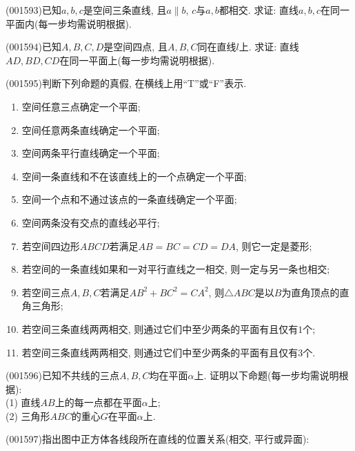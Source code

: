 \item (001593)已知$a,b,c$是空间三条直线, 且$a\parallel b$, $c$与$a,b$都相交. 求证: 直线$a,b,c$在同一平面内(每一步均需说明根据).
\item (001594)已知$A,B,C,D$是空间四点, 且$A,B,C$同在直线$l$上. 求证: 直线$AD,BD,CD$在同一平面上(每一步均需说明根据).
\item (001595)判断下列命题的真假, 在横线上用``T''或``F''表示.
\begin{enumerate}[\blank{30}(1)]
\item 空间任意三点确定一个平面;\\ 
\item 空间任意两条直线确定一个平面;\\ 
\item 空间两条平行直线确定一个平面;\\ 
\item 空间一条直线和不在该直线上的一个点确定一个平面;\\ 
\item 空间一个点和不通过该点的一条直线确定一个平面;\\ 
\item 空间两条没有交点的直线必平行;\\ 
\item 若空间四边形$ABCD$若满足$AB=BC=CD=DA$, 则它一定是菱形;\\ 
\item 若空间的一条直线如果和一对平行直线之一相交, 则一定与另一条也相交;\\ 
\item 若空间三点$A,B,C$若满足$AB^2+BC^2=CA^2$, 则$\triangle ABC$是以$B$为直角顶点的直角三角形;\\ 
\item 若空间三条直线两两相交, 则通过它们中至少两条的平面有且仅有$1$个;\\ 
\item 若空间三条直线两两相交, 则通过它们中至少两条的平面有且仅有$3$个.\\ 
\end{enumerate}
\item (001596)已知不共线的三点$A,B,C$均在平面$\alpha$上. 证明以下命题(每一步均需说明根据):\\ 
(1) 直线$AB$上的每一点都在平面$\alpha$上;\\ 
(2) 三角形$ABC$的重心$G$在平面$\alpha$上.
\item (001597)指出图中正方体各线段所在直线的位置关系(相交, 平行或异面):
\begin{center}
\end{center}
